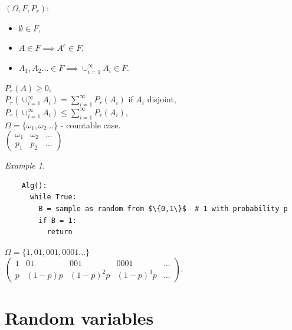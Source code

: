 \documentclass[a4paper, 12pt]{book}
\theoremstyle{definition}
\theoremstyle{remark}
\newtheorem*{ex}{Example}
\begin{document}
$(\Omega, F, P_r)$:
\begin{itemize}[label=$\circ$]
  \item $\emptyset \in F$,
  \item $A \in F \implies A^c \in F$,
  \item $A_1, A_2 \dots \in F \implies \cup_{i=1}^{\infty} A_i \in F$.
\end{itemize}
$P_r(A) \geq 0$, \\
$P_r\left(\cup_{i=1}^{\infty} A_i\right) = \sum_{i=1}^{\infty} P_r(A_i)$ if $A_i$ disjoint, \\
$P_r\left(\cup_{i=1}^{\infty} A_i\right) \leq \sum_{i=1}^{\infty} P_r(A_i)$, \\
$\Omega = \{\omega_1, \omega_2 \dots\}$ - countable case. \\
$\begin{pmatrix}
  \omega_1 & \omega_2 & \dots \\
  p_1 & p_2 & \dots
\end{pmatrix}$
\begin{ex} \text{}
  \begin{lstlisting}
    Alg():
      while True:
        B = sample as random from $\{0,1\}$  # 1 with probability p
        if B = 1:
          return
  \end{lstlisting}
  $\Omega = \{1, 01, 001, 0001 \dots\}$ \\
  $\begin{pmatrix}
    1 & 01 & 001 & 0001 & \dots \\
    p & (1-p)p & (1-p)^2 p & (1-p)^3p & \dots
  \end{pmatrix}$.
\end{ex}


\section{Random variables}
\end{document}
